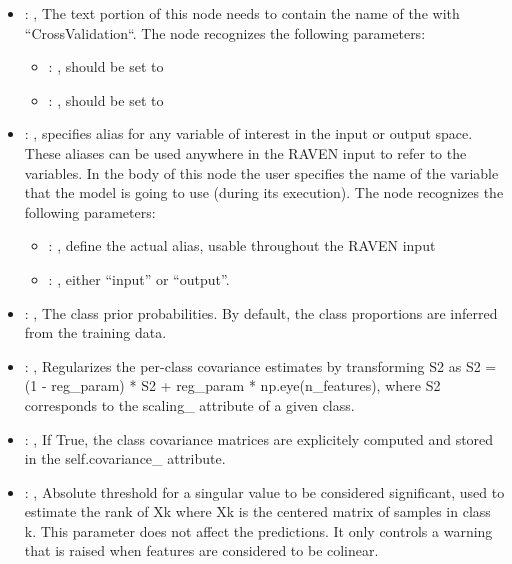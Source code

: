 \begin{itemize}
    \item {}: , 
      The text portion of this node needs to contain the name of the  with
               ``CrossValidation``.
      The  node recognizes the following parameters:
        \begin{itemize}
          \item {}: , 
            should be set to 
          \item {}: , 
            should be set to 
      \end{itemize}

    \item {}: , 
      specifies alias for         any variable of interest in the input or output space. These
      aliases can be used anywhere in the RAVEN input to         refer to the variables. In the body
      of this node the user specifies the name of the variable that the model is going to use
      (during its execution).
      The  node recognizes the following parameters:
        \begin{itemize}
          \item {}: , 
            define the actual alias, usable throughout the RAVEN input
          \item {}: , 
            either ``input'' or ``output''.
      \end{itemize}

    \item {}: , 
      The class prior probabilities. By default, the class
      proportions are inferred from the training data.

    \item {}: , 
      Regularizes the per-class covariance estimates by transforming
      S2 as S2 = (1 - reg\_param) * S2 + reg\_param * np.eye(n\_features),
      where S2 corresponds to the                                                  scaling\_
      attribute of a given class.

    \item {}: , 
      If True, the class covariance matrices are explicitely
      computed and stored in the self.covariance\_ attribute.

    \item {}: , 
      Absolute threshold for a singular value to be considered
      significant, used to estimate the rank of Xk where Xk is the centered
      matrix of samples in class k. This parameter does not affect
      the predictions. It only controls a warning that is raised when
      features are considered to be colinear.
  \end{itemize}


